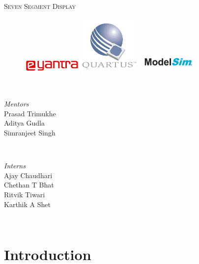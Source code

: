 \documentclass[12pt,singleside,a4paper]{article}
\begin{document}
\begin{titlepage}
	\centering
    \textsc{\LARGE Seven Segment Display}\\[2.0 cm]
    
\begin{figure}[!htb]
\centering
  \includegraphics[width=3cm,keepaspectratio]{logo.png}\textbf{  }\textbf{  }
  \includegraphics[width=3cm,keepaspectratio]{download.png}\textbf{  }
  \includegraphics[width=3cm,keepaspectratio]{modelsim-logo.jpg}
\end{figure}\\[1.0 cm]	
	\begin{minipage}{0.4\textwidth}
		\begin{flushleft} \large
			\emph{Mentors}\\
			Prasad Trimukhe\\
            Aditya Gudla\\
            Simranjeet Singh \
			\end{flushleft}
			\end{minipage}~
			\begin{minipage}{0.4\textwidth}
            
			\begin{flushright} \large
			\emph{Interns} \\
			Ajay Chaudhari\\
            Chethan T Bhat\\
            Ritvik Tiwari \\
            Karthik A Shet \\
		\end{flushright}
	\end{minipage}\\[2 cm]
\end{titlepage}
\newpage
\tableofcontents
\newpage
{}
\section{Introduction}
\end{document}
